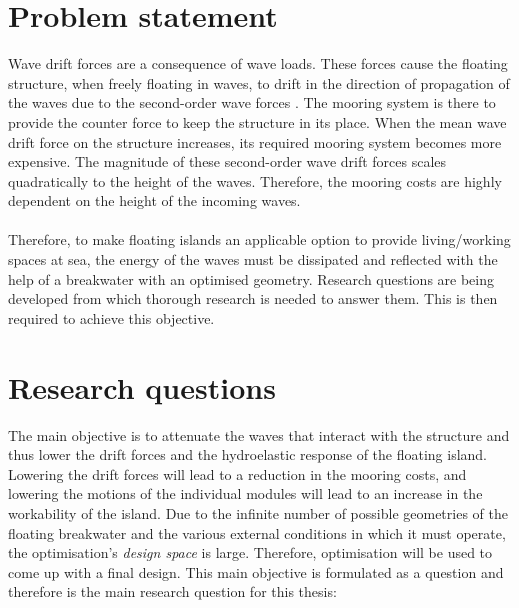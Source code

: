 \section{Problem statement}
Wave drift forces are a consequence of wave loads. These forces cause the floating structure, when freely floating in waves, to drift in the direction of propagation of the waves due to the second-order wave forces \citep{journee2000offshore}. The mooring system is there to provide the counter force to keep the structure in its place. When the mean wave drift force on the structure increases, its required mooring system becomes more expensive. The magnitude of these second-order wave drift forces scales quadratically to the height of the waves. Therefore, the mooring costs are highly dependent on the height of the incoming waves.\\
\\



Therefore, to make floating islands an applicable option to provide living/working spaces at sea, the energy of the waves must be dissipated and reflected with the help of a breakwater with an optimised geometry. Research questions are being developed from which thorough research is needed to answer them. This is then required to achieve this objective.



\section{Research questions}
\label{sec: research questions}
The main objective is to attenuate the waves that interact with the structure and thus lower the drift forces and the hydroelastic response of the floating island. Lowering the drift forces will lead to a reduction in the mooring costs, and lowering the motions of the individual modules will lead to an increase in the workability of the island. Due to the infinite number of possible geometries of the floating breakwater and the various external conditions in which it must operate, the optimisation's \textit{design space} is large. Therefore, optimisation will be used to come up with a final design. This main objective is formulated as a question and therefore is the main research question for this thesis: 

